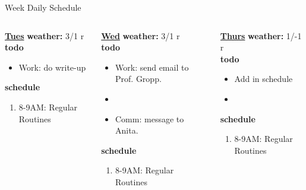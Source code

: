 \begin{columns}
\begin{column}{0.6\linewidth}
\begin{block}{Week Daily Schedule}
\begin{columns}
          \begin{column}{0.14\textwidth}{\small \underline{\bf Tues}}
            {\bf {\tiny  weather:} } {\tiny 3/1 r} \\ 
            {\bf {\tiny todo}}\\ 
            \begin{itemize}
              \tiny \item \tiny Work: do write-up 
            \end{itemize} 
                {{\bf {\tiny  schedule}}}
                \begin{enumerate} 
                  \tiny \item \tiny 8-9AM: Regular Routines 
                \end{enumerate} 
          \end{column}
          \begin{column}{0.14\textwidth}{\small \underline{\bf Wed}}
            {\tiny \bf weather: } {\tiny 3/1 r} \\ 
            {\tiny {\bf todo}}\\
            \begin{itemize}
              \tiny \item \tiny Work: send email to Prof. Gropp. 
            \item \tiny 
            \item \tiny Comm: message to Anita. 
            \end{itemize}
                {\tiny \bf schedule}\\
                \begin{enumerate} 
                  \tiny \item \tiny 8-9AM: Regular Routines 
                \end{enumerate} 
          \end{column}

          \begin{column}{0.14\textwidth}{\small \underline{\bf Thurs}}
            {\tiny \bf weather: } {\tiny 1/-1 r }\\ 
            {\tiny \bf todo} \\ 
            \begin{itemize}
              \tiny \item \tiny Add in schedule
            \item \tiny 
            \end{itemize} 
                {\tiny {\bf schedule}} \\
                \begin{enumerate} 
                  \tiny \item \tiny 8-9AM: Regular Routines 
                \end{enumerate}
          \end{column} 
          

\end{columns}
\end{block}
\end{column}
\end{columns}
